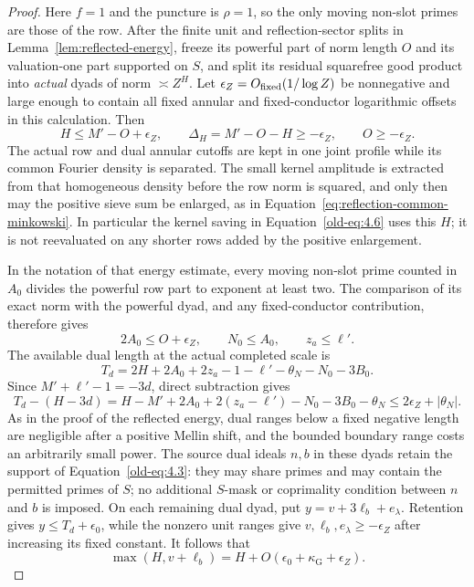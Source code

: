 \begin{proof}
Here $f=1$ and the puncture is $\rho=1$, so the only moving non-slot
primes are those of the row.  After the finite unit and reflection-sector
splits in Lemma~\ref{lem:reflected-energy}, freeze its powerful part of norm length
$O$ and its valuation-one part supported on $S$, and split its residual
squarefree good product into \emph{actual} dyads of norm $\asymp Z^H$.  Let
$\epsilon_Z=O_{\rm fixed}(1/\log Z)$ be nonnegative and large enough
to contain all fixed annular and fixed-conductor logarithmic offsets
in this calculation.  Then
\[
 H\le M'-O+\epsilon_Z,\qquad
 \Delta_H=M'-O-H\ge-\epsilon_Z,\qquad O\ge-\epsilon_Z.
\]
The actual row and dual annular cutoffs are kept in one joint
profile while its common Fourier density is separated.  The small
kernel amplitude is extracted from that homogeneous density before
the row norm is squared, and only then may the positive sieve sum be
enlarged, as in Equation~\eqref{eq:reflection-common-minkowski}.
In particular the kernel saving in
Equation~\eqref{old-eq:4.6} uses this $H$; it is not reevaluated on
any shorter rows added by the positive enlargement.

In the notation of that energy estimate, every moving non-slot prime
counted in $A_0$ divides the powerful row part to exponent at least
two.  The comparison of its exact norm with the powerful dyad, and
any fixed-conductor contribution, therefore gives
\[
 2A_0\le O+\epsilon_Z,\qquad N_0\le A_0,\qquad z_a\le\ell'.
\]
The available dual length at the actual completed scale is
\[
 T_d=2H+2A_0+2z_a-1-\ell'-\theta_N-N_0-3B_0.
\]
Since $M'+\ell'-1=-3d$, direct subtraction gives
\[
 T_d-(H-3d)
 =H-M'+2A_0+2(z_a-\ell')-N_0-3B_0-\theta_N
 \le 2\epsilon_Z+|\theta_N|.
\]
As in the proof of the reflected energy, dual ranges below a fixed
negative length are negligible after a positive Mellin shift, and
the bounded boundary range costs an arbitrarily small power.
The source dual ideals $n,b$ in these dyads retain the support of
Equation~\eqref{old-eq:4.3}: they may share primes and may contain
the permitted primes of $S$; no additional $S$-mask or coprimality
condition between $n$ and $b$ is imposed.
On each remaining dual dyad, put $y=v+3\ell_b+e_\lambda$.  Retention
gives $y\le T_d+\epsilon_0$, while the nonzero unit ranges give
$v,\ell_b,e_\lambda\ge-\epsilon_Z$ after increasing its fixed
constant.  It follows that
\[
 \max(H,v+\ell_b)=H+O(\epsilon_0+\kappa_{\mathrm G}+\epsilon_Z).
\]


\end{proof}

